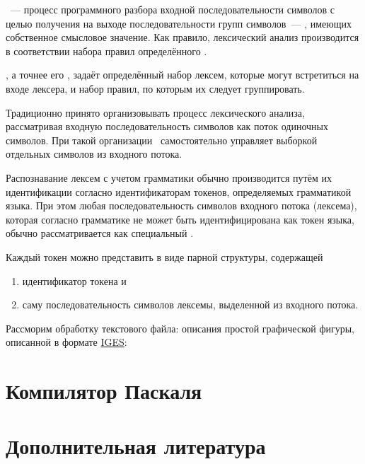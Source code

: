 \ --- процесс программного разбора входной
последовательности символов с целью получения на выходе последовательности групп
символов\ --- , имеющих собственное смысловое
значение. Как правило, лексический анализ
производится в соответствии набора правил определённого .

\begin{framed}
, а точнее его
, задаёт определённый набор лексем, которые могут встретиться
на входе лексера, и набор правил, по которым их следует группировать.
\end{framed}

Традиционно принято организовывать процесс лексического анализа, рассматривая
входную последовательность символов как поток одиночных символов. При такой
организации \ самостоятельно управляет выборкой отдельных символов
из входного потока.

Распознавание лексем с учетом грамматики обычно производится путём их
идентификации согласно идентификаторам токенов, определяемых грамматикой языка.
При этом любая последовательность символов входного потока (лексема), которая
согласно грамматике не может быть идентифицирована как токен языка, обычно
рассматривается как специальный .

\bigskip
Каждый  токен можно представить в виде парной структуры,
содержащей
\begin{enumerate}
  \item идентификатор токена и
  \item саму последовательность символов лексемы, выделенной из входного
потока.
\end{enumerate}

\bigskip
Рассморим обработку текстового файла: описания простой графической фигуры,
описанной в формате \href{https://ru.wikipedia.org/wiki/IGES}{IGES}:


\section{Компилятор Паскаля}

\section{Дополнительная литература}\label{lexlit}

